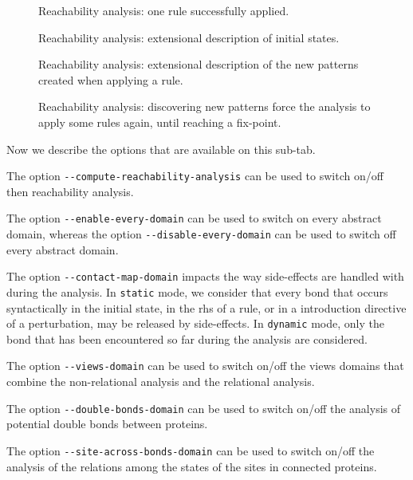 \documentclass[11pt]{book}
\begin{document}
\begin{figure}[t]

\caption{Reachability analysis: one rule successfully applied.}
\label{fig:reachability_medium_ok}
\end{figure}

\begin{figure}[t]

\caption{Reachability analysis: extensional description of initial states.}
\label{fig:reachability_high_init}
\end{figure}

\begin{figure}[t]

\caption{Reachability analysis: extensional description of the new patterns  created when applying a rule.}
\label{fig:reachability_high_rule}
\end{figure}

\begin{figure}[t]

\caption{Reachability analysis: discovering new patterns force the analysis to apply some rules again, until reaching a fix-point.}
\label{fig:reachability_full}
\end{figure}

Now we describe the options that are available on this sub-tab.

The option \verb?--compute-reachability-analysis? can be used to switch on/off then reachability analysis.

The option \verb?--enable-every-domain? can be used to switch on every abstract domain, whereas the option \verb?--disable-every-domain? can be used to switch off every abstract domain.

The option \verb?--contact-map-domain? impacts the way side-effects are handled with during the analysis. In \verb?static? mode, we consider that every bond that occurs syntactically in the initial state, in the rhs of a rule, or in a introduction directive of a perturbation, may be released by side-effects.
In \verb?dynamic? mode, only the bond that has been encountered so far during the analysis are considered.

The option \verb?--views-domain? can be used to switch on/off the views domains that combine the non-relational analysis and the relational analysis.

The option \verb?--double-bonds-domain? can be used to switch on/off the analysis of potential double bonds between proteins.

The option \verb?--site-across-bonds-domain? can be used to switch on/off the analysis of the relations among the states of the sites in connected proteins.
\end{document}
